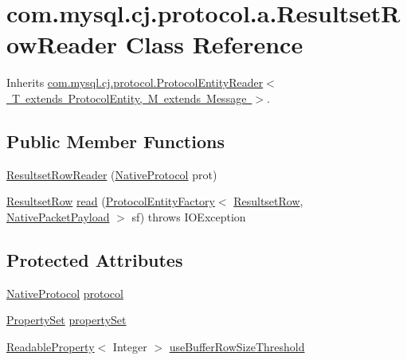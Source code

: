 \hypertarget{classcom_1_1mysql_1_1cj_1_1protocol_1_1a_1_1_resultset_row_reader}{}\section{com.\+mysql.\+cj.\+protocol.\+a.\+Resultset\+Row\+Reader Class Reference}
\label{classcom_1_1mysql_1_1cj_1_1protocol_1_1a_1_1_resultset_row_reader}


Inherits \mbox{\hyperlink{interfacecom_1_1mysql_1_1cj_1_1protocol_1_1_protocol_entity_reader}{com.\+mysql.\+cj.\+protocol.\+Protocol\+Entity\+Reader$<$ T extends Protocol\+Entity, M extends Message $>$}}.

\subsection*{Public Member Functions}
\begin{DoxyCompactItemize}
\item 
\mbox{\hyperlink{classcom_1_1mysql_1_1cj_1_1protocol_1_1a_1_1_resultset_row_reader_a3f790668961e51d87c8fa296e0c164a7}{Resultset\+Row\+Reader}} (\mbox{\hyperlink{classcom_1_1mysql_1_1cj_1_1protocol_1_1a_1_1_native_protocol}{Native\+Protocol}} prot)
\item 
\mbox{\hyperlink{interfacecom_1_1mysql_1_1cj_1_1protocol_1_1_resultset_row}{Resultset\+Row}} \mbox{\hyperlink{classcom_1_1mysql_1_1cj_1_1protocol_1_1a_1_1_resultset_row_reader_a573b457be8bdc0762d3dac20eb23ca05}{read}} (\mbox{\hyperlink{interfacecom_1_1mysql_1_1cj_1_1protocol_1_1_protocol_entity_factory}{Protocol\+Entity\+Factory}}$<$ \mbox{\hyperlink{interfacecom_1_1mysql_1_1cj_1_1protocol_1_1_resultset_row}{Resultset\+Row}}, \mbox{\hyperlink{classcom_1_1mysql_1_1cj_1_1protocol_1_1a_1_1_native_packet_payload}{Native\+Packet\+Payload}} $>$ sf)  throws I\+O\+Exception 
\end{DoxyCompactItemize}
\subsection*{Protected Attributes}
\begin{DoxyCompactItemize}
\item 
\mbox{\hyperlink{classcom_1_1mysql_1_1cj_1_1protocol_1_1a_1_1_native_protocol}{Native\+Protocol}} \mbox{\hyperlink{classcom_1_1mysql_1_1cj_1_1protocol_1_1a_1_1_resultset_row_reader_a7d9db6565b3aaeebbcdbb4643c06013e}{protocol}}
\item 
\mbox{\hyperlink{interfacecom_1_1mysql_1_1cj_1_1conf_1_1_property_set}{Property\+Set}} \mbox{\hyperlink{classcom_1_1mysql_1_1cj_1_1protocol_1_1a_1_1_resultset_row_reader_af9773a7d86a3846ca78640038513ff2f}{property\+Set}}
\item 
\mbox{\hyperlink{interfacecom_1_1mysql_1_1cj_1_1conf_1_1_readable_property}{Readable\+Property}}$<$ Integer $>$ \mbox{\hyperlink{classcom_1_1mysql_1_1cj_1_1protocol_1_1a_1_1_resultset_row_reader_a76822f083abe98e2b745d5b7cb91d90b}{use\+Buffer\+Row\+Size\+Threshold}}
\end{DoxyCompactItemize}


